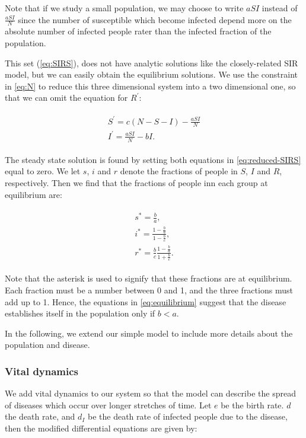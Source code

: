\documentclass[../main.tex]{subfiles}
\begin{document}
Note that if we study a small population, we may choose to write \ensuremath{aSI} instead of \ensuremath{\frac{aSI}{N}} since the number of susceptible which become infected depend more on the absolute number of infected people rater than the infected fraction of the population. 

This set (\cref{eq:SIRS}), does not have analytic solutions like the closely-related SIR model, but we can easily obtain the equilibrium solutions. We use the constraint in \cref{eq:N} to reduce this three dimensional system into a two dimensional one, so that we can omit the equation for \ensuremath{R^{'}}:

\begin{align}
    \begin{split}
        S^{'}=c(N-S-I)-\frac{aSI}{N} \\
        I^{'}=\frac{aSI}{N}-bI.
    \end{split}
    \label{eq:reduced-SIRS}
\end{align}

The steady state solution is found by setting both equations in \cref{eq:reduced-SIRS} equal to zero. We let $s$, $i$ and $r$ denote the fractions of people in $S$, $I$ and $R$, respectively. Then we find that the fractions of people inn each group at equilibrium are:

\begin{align}
    \begin{split}
        s^*=\frac{b}{a}, \\
        i^*=\frac{1-\frac{b}{a}}{1-\frac{b}{c}}, \\
        r^*=\frac{b}{c}\frac{1-\frac{b}{a}}{1+\frac{b}{c}}.
    \end{split}
    \label{eq:equilibrium}
\end{align}

Note that the asterisk is used to signify that these fractions are at equilibrium. Each fraction must be a number between 0 and 1, and the three fractions must add up to 1. Hence, the equations in \cref{eq:equilibrium} suggest that the disease establishes itself in the population only if \ensuremath{b<a}.

In the following, we extend our simple model to include more details about the population and disease. 

\subsubsection{Vital dynamics}
We add vital dynamics to our system so that the model can describe the spread of diseases which occur over longer stretches of time. Let $e$  be the birth rate. $d$ the death rate, and $d_I$ be the death rate of infected people due to the disease, then the modified differential equations are given by:
\end{document}
